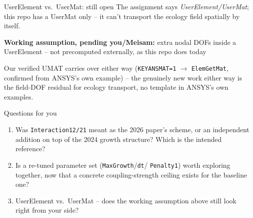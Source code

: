 \documentclass[aspectratio=169,11pt]{beamer}
\begin{document}
\begin{frame}{UserElement vs.\ UserMat: still open}
\small The assignment says \emph{UserElement/UserMat}; this repo has a
UserMat only -- it can't transport the ecology field spatially by itself.
\vspace{6pt}
\begin{center}
\colorbox{c3!12}{\parbox{0.85\linewidth}{\centering\small
\textbf{Working assumption, pending you/Meisam:} extra nodal DOFs inside a
UserElement -- not precomputed externally, as this repo does today}}
\end{center}
\vspace{6pt}
{\scriptsize Our verified UMAT carries over either way
(\texttt{KEYANSMAT=1} $\to$ \texttt{ElemGetMat}, confirmed from ANSYS's
own example) -- the genuinely new work either way is the field-DOF
residual for ecology transport, no template in ANSYS's own examples.}
\end{frame}

\begin{frame}{Questions for you}
\begin{enumerate}
  \item Was \texttt{Interaction12/21} meant as the 2026 paper's scheme, or
        an independent addition on top of the 2024 growth structure? Which
        is the intended reference?
  \item Is a re-tuned parameter set (\texttt{MaxGrowth}/\texttt{dt}/
        \texttt{Penalty1}) worth exploring together, now that a concrete
        coupling-strength ceiling exists for the baseline one?
  \item UserElement vs.\ UserMat -- does the working assumption above
        still look right from your side?
\end{enumerate}
\end{frame}
\end{document}
